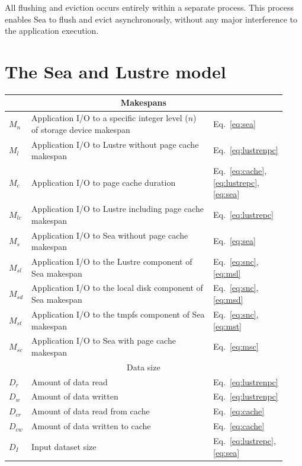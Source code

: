 \documentclass{report}
\begin{document}
   All flushing and eviction occurs entirely within a separate process. This process
   enables Sea to flush and evict asynchronously, without any major interference
   to the application execution.
   
    \section{The Sea and Lustre model}\label{model}

    \begin{table}
    \centering
    \begin{tabular}{|p{0.03\linewidth}|p{0.7\linewidth}|p{0.2\linewidth}|} 
     \hline
     \multicolumn{3}{|c|}{Makespans} \\
     \hline
     $M_{n}$ & Application I/O to a specific integer level ($n$) of storage device makespan & Eq.~\ref{eq:sea}\\
     $M_{l}$ & Application I/O to Lustre without page cache makespan & Eq.~\ref{eq:lustrenpc}\\
     $M_{c}$ & Application I/O to page cache duration & Eq.~\ref{eq:cache}, \ref{eq:lustrepc}, \ref{eq:sea}\\
     $M_{lc}$ & Application I/O to Lustre including page cache makespan & Eq.~\ref{eq:lustrepc}\\
     $M_{s}$ & Application I/O to Sea without page cache makespan & Eq.~\ref{eq:sea}\\ 
     $M_{sl}$ & Application I/O to the Lustre component of Sea makespan & Eq.~\ref{eq:snc}, \ref{eq:msl} \\
     $M_{sd}$ & Application I/O to the local disk component of Sea makespan& Eq.~\ref{eq:snc}, \ref{eq:msd} \\
     $M_{st}$ & Application I/O to the tmpfs component of Sea makespan & Eq.~\ref{eq:snc}, \ref{eq:mst} \\
     $M_{sc}$ & Application I/O to Sea with page cache makespan & Eq.~\ref{eq:msc} \\ 
     \hline
     \multicolumn{3}{|c|}{Data size} \\
     \hline
     $D_{r}$ & Amount of data read & Eq.~\ref{eq:lustrenpc}\\
     $D_{w}$ & Amount of data written & Eq.~\ref{eq:lustrenpc}\\
     $D_{cr}$ & Amount of data read from cache & Eq.~\ref{eq:cache}\\
     $D_{cw}$ & Amount of data written to cache & Eq.~\ref{eq:cache}\\
     $D_{I}$ & Input dataset size & Eq.~\ref{eq:lustrepc}, \ref{eq:sea}\\

\end{tabular}
\end{table}
\end{document}

